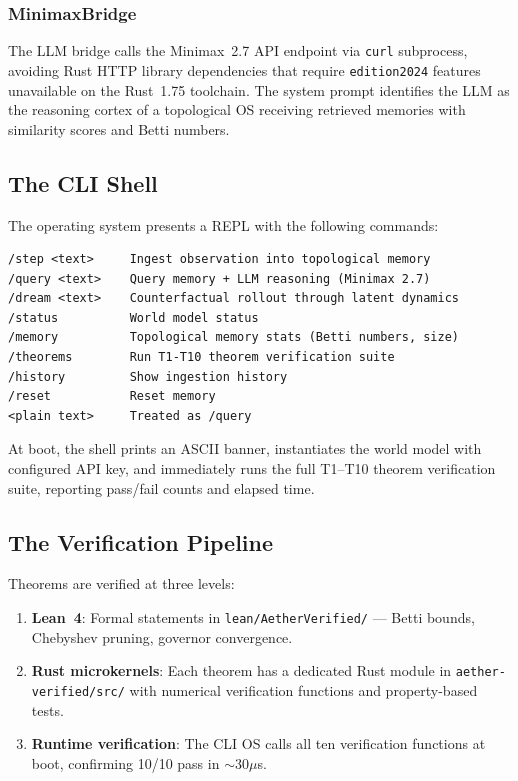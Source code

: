 \documentclass[11pt, a4paper]{article}
\theoremstyle{proofform}
\numberwithin{innerpoints}{subsection}
\numberwithin{disproof}{subsection}
\theoremstyle{mathproof}
\begin{document}
\subsubsection{MinimaxBridge}

The LLM bridge calls the Minimax~2.7 API endpoint via \texttt{curl} subprocess, avoiding Rust HTTP library dependencies that require \texttt{edition2024} features unavailable on the Rust~1.75 toolchain. The system prompt identifies the LLM as the reasoning cortex of a topological OS receiving retrieved memories with similarity scores and Betti numbers.

\subsection{The CLI Shell}

The operating system presents a REPL with the following commands:

\begin{lstlisting}[caption={Epsilon-Hollow CLI commands}]
/step <text>     Ingest observation into topological memory
/query <text>    Query memory + LLM reasoning (Minimax 2.7)
/dream <text>    Counterfactual rollout through latent dynamics
/status          World model status
/memory          Topological memory stats (Betti numbers, size)
/theorems        Run T1-T10 theorem verification suite
/history         Show ingestion history
/reset           Reset memory
<plain text>     Treated as /query
\end{lstlisting}

At boot, the shell prints an ASCII banner, instantiates the world model with configured API key, and immediately runs the full T1--T10 theorem verification suite, reporting pass/fail counts and elapsed time.

\subsection{The Verification Pipeline}

Theorems are verified at three levels:
\begin{enumerate}[nosep]
  \item \textbf{Lean~4}: Formal statements in \texttt{lean/AetherVerified/} --- Betti bounds, Chebyshev pruning, governor convergence.
  \item \textbf{Rust microkernels}: Each theorem has a dedicated Rust module in \texttt{aether-verified/src/} with numerical verification functions and property-based tests.
  \item \textbf{Runtime verification}: The CLI OS calls all ten verification functions at boot, confirming 10/10 pass in $\sim$30$\mu$s.
\end{enumerate}
\end{document}
